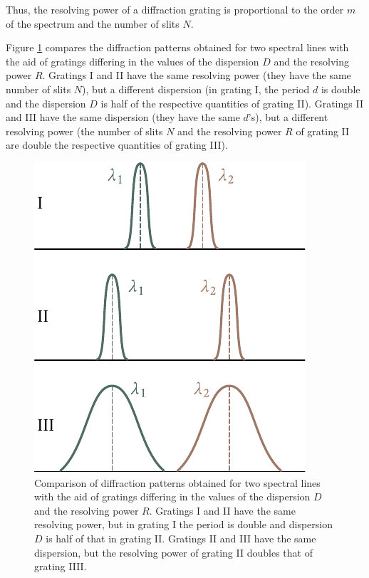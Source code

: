 \noindent
Thus, the resolving power of a diffraction grating is proportional to the order $m$ of the spectrum and the number of slits $N$.

Figure \ref{fig:18_38} compares the diffraction patterns obtained for two spectral lines with the aid of gratings differing in the values of the dispersion $D$ and the resolving power $R$.
Gratings I and II have the same resolving power (they have the same number of slits $N$), but a different dispersion (in grating I, the period $d$ is double and the dispersion $D$ is half of the respective quantities of grating II).
Gratings II and III have the same dispersion (they have the same $d$'s), but a different resolving power (the number of slits $N$ and the resolving power $R$ of grating II are double the respective quantities of grating III).

\begin{figure}[t]
	\begin{center}
		\includegraphics[scale=1.0]{figures/ch_18/fig_18_38.pdf}
        \caption[]{Comparison of diffraction patterns obtained for two spectral lines with the aid of gratings differing in the values of the dispersion $D$ and the resolving power $R$. Gratings I and II have the same resolving power, but in grating I the period is double and dispersion $D$ is half of that in grating II. Gratings II and III have the same dispersion, but the resolving power of grating II doubles that of grating IIII.}
		\label{fig:18_38}
	\end{center}
	\vspace{-0.8cm}
\end{figure}

